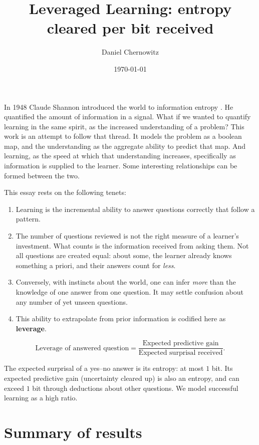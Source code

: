 \documentclass[11pt]{article}
\title{Leveraged Learning: entropy cleared per bit received}
\author{Daniel Chernowitz}
\date{\today}
\let\stdsection\section
\renewcommand{\section}{\clearpage\stdsection}
\begin{document}
\maketitle

In 1948 Claude Shannon introduced the world to information entropy \cite{shannon48}.
He quantified the amount of information in a signal. What if we wanted to quantify learning in the same spirit, as the increased understanding of a problem?
This work is an attempt to follow that thread. It models the problem as a boolean map, and the understanding as the aggregate ability to predict that map.
And learning, as the speed at which that understanding increases, specifically as information is supplied to the learner. Some interesting relationships can be formed between the two.

This essay rests on the following tenets:
\begin{enumerate}
  \item Learning is the incremental ability to answer questions correctly that follow a pattern.
  \item The number of questions
reviewed is not the right measure of a learner's investment. What
counts is the information received from asking them. Not all
questions are created equal: about some, the learner already knows
something a priori, and their answers count for \emph{less}.
\item Conversely, with instincts about the world, one can infer \emph{more} than the knowledge of one answer from one question.
It may settle confusion about any number of yet unseen questions. 
\item This ability to extrapolate from prior information is codified here as \textbf{leverage}.
\end{enumerate}
%
\begin{equation}
  \text{Leverage of answered question} = \frac{\text{Expected predictive gain}}{\text{Expected surprisal received}}.
\end{equation}

The expected surprisal of a yes--no answer is its entropy: at most $1$ bit. Its
expected predictive gain (uncertainty cleared up) is also an entropy, and can exceed $1$ bit through deductions about
other questions. We model successful learning as a high ratio.

\stdsection*{Summary of results}
\end{document}
